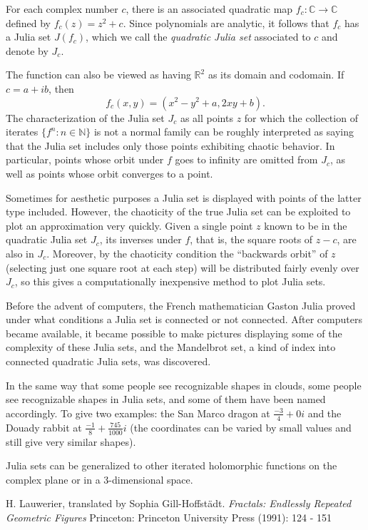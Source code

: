 \documentclass[12pt]{article}
\begin{document}
For each complex number $c$, there is an associated quadratic map
$f_c\colon\mathbb{C}\to\mathbb{C}$ defined by $f_c(z) = z^2 + c$.
Since polynomials are analytic, it follows that $f_c$ has a Julia set
$J(f_c)$, which we call the \emph{quadratic Julia set} associated to
$c$ and denote by $J_c$.

The function can also be viewed as having $\mathbb{R}^2$ as its domain
and codomain.  If $c = a + ib$, then
\[
  f_c(x, y) = (x^2 - y^2 + a, 2xy + b).
\]
The characterization of the Julia set $J_c$ as all points $z$ for which the
collection of iterates $\{f^n\colon n\in\mathbb{N}\}$ is not a normal
family can be roughly interpreted as saying that the Julia set
includes only those points exhibiting chaotic behavior.  In
particular, points whose orbit under $f$ goes to infinity are omitted
from $J_c$, as well as points whose orbit converges to a point.

Sometimes for aesthetic purposes a Julia set is displayed with points
of the latter type included.  However, the chaoticity of the true Julia
set can be exploited to plot an approximation very quickly.  Given a
single point $z$ known to be in the quadratic Julia set $J_c$, its inverses 
under $f$, that is, the square roots of $z - c$, are also in $J_c$.  Moreover,
by the chaoticity condition the ``backwards orbit'' of $z$ (selecting just one 
square root at each step) will be distributed fairly evenly
over $J_c$, so this gives a computationally inexpensive method to plot
Julia sets.

Before the advent of computers, the French mathematician Gaston Julia
proved under what conditions a Julia set is connected or not
connected.  After computers became available, it became possible to
make pictures displaying some of the complexity of these Julia sets,
and the Mandelbrot set, a kind of index into connected quadratic Julia
sets, was discovered.

In the same way that some people see recognizable shapes in clouds,
some people see recognizable shapes in Julia sets, and some of them
have been named accordingly. To give two examples: the San Marco
dragon at $\frac{-3}{4} + 0i$ and the Douady rabbit at $\frac{-1}{8} +
\frac{745}{1000}i$ (the coordinates can be varied by small values and
still give very similar shapes).

Julia sets can be generalized to other iterated holomorphic functions
on the complex plane or in a 3-dimensional space.

\begin{thebibliography}{1}
 H. Lauwerier, translated by Sophia Gill-Hoffst\"adt. {\it Fractals: Endlessly Repeated Geometric Figures} Princeton: Princeton University Press (1991): 124 - 151
\end{thebibliography}

\end{document}
